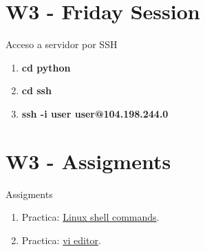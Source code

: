 \documentclass{beamer}
\begin{document}
\section{W3 - Friday Session }

\begin{frame}


Acceso a servidor por SSH

\begin{enumerate}
\item
	\textbf{cd python}
\item
	\textbf{cd ssh}
\item
	\textbf{ssh -i user user@104.198.244.0}
\end{enumerate} 


\end{frame}



\section{W3 - Assigments }

\begin{frame}

Assigments


\begin{enumerate}
\item
	 
	Practica: \href{https://github.com/adsoftsito/python/blob/master/w1/linuxcommands.pdf}{Linux shell commands}.
	
    
\item
	Practica: \href{https://github.com/adsoftsito/python/blob/master/w1/vi-editor.pdf}{vi editor}.

\end{enumerate} 


\end{frame}
\end{document}

